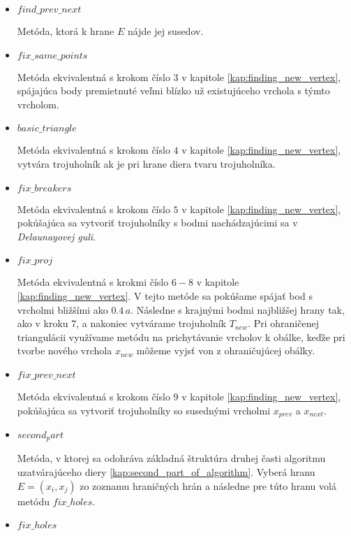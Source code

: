 \begin{itemize}
{\begin{itemize}
{                Metóda, ktorá vypočíta bod $x_{new}$ pre hraničnú hranu $E$.
            }
            \item{
                $find\_prev\_next$

                Metóda, ktorá k hrane $E$ nájde jej susedov. 
            }
            \item{
                $fix\_same\_points$

                Metóda ekvivalentná s krokom číslo $3$ v kapitole \ref{kap:finding_new_vertex}, 
                spájajúca body premietnuté veľmi blízko už existujúceho vrchola s týmto vrcholom.
            }
            \item{
                $basic\_triangle$

                Metóda ekvivalentná s krokom číslo $4$ v kapitole \ref{kap:finding_new_vertex},
                vytvára trojuholník ak je pri hrane diera tvaru trojuholníka.
            }
            \item{
                $fix\_breakers$

                Metóda ekvivalentná s krokom číslo $5$ v kapitole \ref{kap:finding_new_vertex},
                pokúšajúca sa vytvoriť trojuholníky s bodmi nachádzajúcimi sa v 
                \textit{Delaunayovej guli}.
            }
            \item{
                $fix\_proj$

                Metóda ekvivalentná s krokmi číslo $6-8$ v kapitole \ref{kap:finding_new_vertex}.
                V tejto metóde sa pokúšame spájať bod s vrcholmi bližšími ako $0.4 \, a$. Následne 
                s krajnými bodmi najbližšej hrany tak, ako v kroku $7$, a nakoniec vytvárame 
                trojuholník $T_{new}$. Pri ohraničenej triangulácii využívame
                metódu na prichytávanie vrcholov
                k obálke, keďže pri tvorbe nového vrchola $x_{new}$ môžeme vyjsť von z 
                ohraničujúcej obálky.
            }
            \item{
                $fix\_prev\_next$

                Metóda ekvivalentná s krokom číslo $9$ v kapitole \ref{kap:finding_new_vertex},
                pokúšajúca sa vytvoriť trojuholníky so susednými vrcholmi $x_{prev}$ a $x_{next}$.
            }
            \item{
                $second_part$

                Metóda, v ktorej sa odohráva základná štruktúra druhej časti algoritmu uzatvárajúceho
                diery \ref{kap:second_part_of_algorithm}. Vyberá hranu $E=(x_i, x_j)$ zo zoznamu hraničných 
                hrán a následne pre túto hranu volá metódu $fix\_holes$.
            }
            \item{
                $fix\_holes$

}
\end{itemize}}
\end{itemize}
